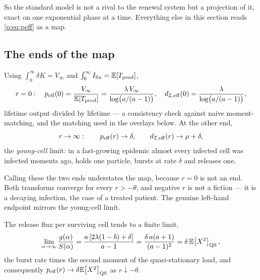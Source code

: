 \noindent
So the standard model is not a rival to the renewal system but a projection
of it, exact on one exponential phase at a time. Everything else in this
section reads \cref{p:eq:peff} as a map.

\subsection{The ends of the map}

Using $\int_0^\infty\delta K=V_\infty$ and
$\int_0^\infty I_{\mathrm{fix}}=\mathbb{E}\!\left[T_{\rm prod}\right]$,
\begin{equation}
r=0:\quad
p_{\rm eff}(0)=\frac{V_\infty}{\mathbb{E}\!\left[T_{\rm prod}\right]}
=\frac{\lambda\,V_\infty}{\log\bigl(a/(a-1)\bigr)},
\quad
d_{\mathcal{I},{\rm eff}}(0)=\frac{\lambda}{\log\bigl(a/(a-1)\bigr)},
\label{p:eq:peff0}
\end{equation}
lifetime output divided by lifetime --- a consistency check against naive
moment-matching, and the matching used in the overlays below. At the other
end,
\begin{equation}
r\to\infty:\qquad
p_{\rm eff}(r)\to\delta,
\qquad
d_{\mathcal{I},{\rm eff}}(r)\to\mu+\delta,
\label{p:eq:peffinf}
\end{equation}
the \emph{young-cell} limit: in a fast-growing epidemic almost every
infected cell was infected moments ago, holds one particle, bursts at rate
$\delta$ and releases one.

Calling these the two ends understates the map, because $r=0$ is not an end.
Both transforms converge for every $r>-\theta$, and negative $r$ is not a
fiction --- it is a decaying infection, the case of a treated patient. The
genuine left-hand endpoint mirrors the young-cell limit.

\begin{proposition}
\label{p:prop:oldcell}
The release flux per surviving cell tends to a finite limit,
\begin{equation}
\lim_{\alpha\to\infty}\frac{g(\alpha)}{S(\alpha)}
=\frac{a\left[2\lambda(1-b)+\delta\right]}{a-1}
=\frac{\delta\,a(a+1)}{(a-1)^2}
=\delta\,\mathbb{E}\!\left[X^2\right]_{\rm QS},
\label{p:eq:oldcell}
\end{equation}
the burst rate times the second moment of the quasi-stationary load, and
consequently $p_{\rm eff}(r)\to\delta\mathbb{E}\!\left[X^2\right]_{\rm QS}$ as
$r\downarrow-\theta$.
\end{proposition}

